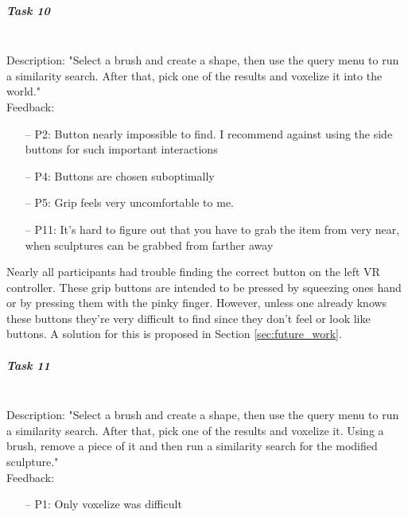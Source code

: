 \subparagraph{Task 10} \hfill \\
Description: "Select a brush and create a shape, then use the query menu to run a similarity search. After that, pick one of the results and voxelize it into the world."\\
Feedback:
\begin{enumerate} \setlength\itemsep{-0.5em}
	\item[--] P2: Button nearly impossible to find. I recommend against using the side buttons for such important interactions
	\item[--] P4: Buttons are chosen suboptimally
	\item[--] P5: Grip feels very uncomfortable to me.
	\item[--] P11: It's hard to figure out that you have to grab the item from very near, when sculptures can be grabbed from farther away
\end{enumerate}
Nearly all participants had trouble finding the correct button on the left VR controller. These grip buttons are intended to be pressed by squeezing ones hand or by pressing them with the pinky finger. However, unless one already knows these buttons they're very difficult to find since they don't feel or look like buttons. A solution for this is proposed in Section \ref{sec:future_work}.

\subparagraph{Task 11} \hfill \\
Description: "Select a brush and create a shape, then use the query menu to run a similarity search. After that, pick one of the results and voxelize it. Using a brush, remove a piece of it and then run a similarity search for the modified sculpture."\\
Feedback:
\begin{enumerate} \setlength\itemsep{-0.5em}
	\item[--] P1: Only voxelize was difficult
\end{enumerate}

